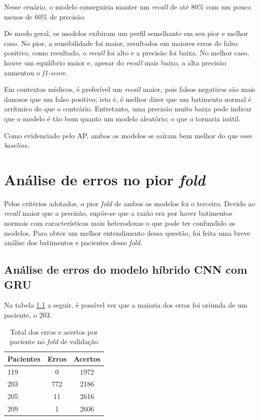 Nesse cenário, o modelo conseguiria manter um \textit{recall} de até 80\% com um pouco menos de 60\% de precisão.

De modo geral, os modelos exibiram um perfil semelhante em seu pior e melhor caso. No pior, a sensibilidade foi maior, resultados
em maiores erros de falso positivo, como resultado, o \textit{recall} foi alto e a precisão foi baixa. No melhor caso, houve um 
equilíbrio maior e, apesar do \textit{recall} mais baixo, a alta precisão aumentou o \textit{f1-score}.

Em contextos médicos, é preferível um \textit{recall} maior, pois falsos negativos são mais danosos que um falso positivo; isto é, é melhor
dizer que um batimento normal é arrítmico do que o contrário. Entretanto, uma precisão muito baixa pode indicar que o modelo é 
tão bom quanto um modelo aleatório; o que o tornaria inútil. 

Como evidenciado pelo AP, ambos os modelos se saíram bem melhor do que esse \textit{baseline}.

\chapter{Análise de erros no pior \textit{fold}}
\label{ch:analise_erros_pior_fold}

Pelos critérios adotados, o pior \textit{fold} de ambos os modelos foi o terceiro. Devido ao \textit{recall} maior que a precisão, supõe-se que 
a razão era por haver batimentos normais com características mais heterodoxas o que pode ter confundido os modelos. Para obter um melhor entendimento
dessa questão, foi feita uma breve análise dos batimentos e pacientes desse \textit{fold}. 

\section{Análise de erros do modelo híbrido CNN com GRU}
\label{sec:analise_erros_cnn_gru}

Na tabela \ref{tab:erros_acertos_por_paciente} a seguir, é possível ver que a maioria dos erros foi oriunda de um paciente, o 203.

\begin{table}[H]
\centering
\caption{Total dos erros e acertos por paciente no \textit{fold} de validação}
\label{tab:erros_acertos_por_paciente}
\begin{tabular}{lcc}
\hline
\textbf{Pacientes} & \textbf{Erros} & \textbf{Acertos}\\
\hline
119 & 0 &  1972 \\
203 & 772  & 2186\\
205 & 11 & 2616\\
209 & 1 & 2606\\
\hline
\end{tabular}
\end{table}

